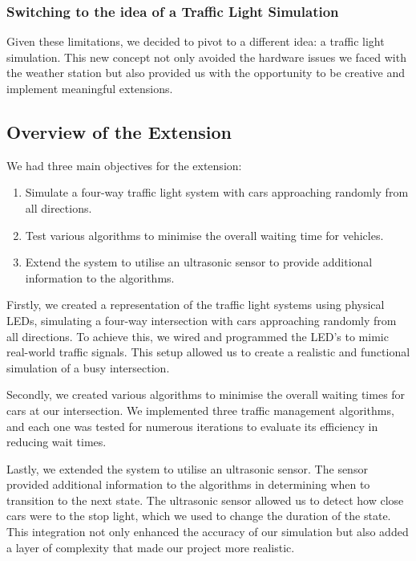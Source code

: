 \documentclass{article}
\begin{document}
\subsubsection{Switching to the idea of a Traffic Light Simulation}
Given these limitations, we decided to pivot to a different idea: a traffic light simulation. This new concept not only avoided the hardware issues we faced with the weather station but also provided us with the opportunity to be creative and implement meaningful extensions.

\subsection{Overview of the Extension}
We had three main objectives for the extension:

\begin{enumerate}[itemsep=0.5mm]
    \item Simulate a four-way traffic light system with cars approaching randomly from all directions.
    \item Test various algorithms to minimise the overall waiting time for vehicles.
    \item Extend the system to utilise an ultrasonic sensor to provide additional information to the algorithms.
\end{enumerate}

Firstly, we created a representation of the traffic light systems using physical LEDs, simulating a four-way intersection with cars approaching randomly from all directions. To achieve this, we wired and programmed the LED’s to mimic real-world traffic signals. This setup allowed us to create a realistic and functional simulation of a busy intersection.

Secondly, we created various algorithms to minimise the overall waiting times for cars at our intersection. We implemented three traffic management algorithms, and each one was tested for numerous iterations to evaluate its efficiency in reducing wait times.

Lastly, we extended the system to utilise an ultrasonic sensor. The sensor provided additional information to the algorithms in determining when to transition to the next state. The ultrasonic sensor allowed us to detect how close cars were to the stop light, which we used to change the duration of the state. This integration not only enhanced the accuracy of our simulation but also added a layer of complexity that made our project more realistic.
\end{document}
